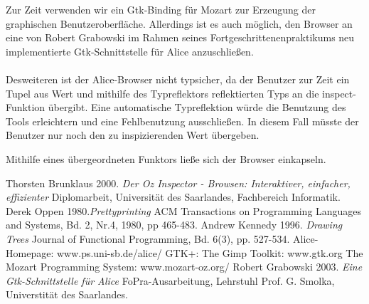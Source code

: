\documentclass[12pt,a4paper]{article}
\begin{document}
Zur Zeit verwenden wir ein Gtk-Binding f\"ur Mozart \cite{mo:mo}
zur Erzeugung der graphischen Benutzeroberfl\"ache. Allerdings ist 
es auch m\"oglich, den Browser an eine von Robert Grabowski im Rahmen 
seines Fortgeschrittenenpraktikums neu implementierte Gtk-Schnittstelle
f\"ur Alice \cite{gr:gt} anzuschlie\ss en.

\paragraph{}

Desweiteren ist der Alice-Browser nicht typsicher, 
da der Benutzer zur Zeit ein Tupel aus 
Wert und mithilfe des Typreflektors reflektierten Typs 
an die inspect-Funktion \"ubergibt.  
Eine automatische Typreflektion w\"urde die Benutzung des Tools 
erleichtern und eine Fehlbenutzung ausschlie\ss en. 
In diesem Fall m\"usste der Benutzer nur noch den zu 
inspizierenden Wert \"ubergeben. 

Mithilfe eines \"ubergeordneten Funktors lie\ss e 
sich der Browser einkapseln.


\begin{thebibliography}{99}

 Thorsten Brunklaus 2000. {\em Der Oz Inspector - Browsen: 
    Interaktiver, einfacher, effizienter} Diplomarbeit, Universit\"{a}t 
    des Saarlandes, Fachbereich Informatik.
 Derek Oppen 1980.{\em Prettyprinting} ACM Transactions 
  on Programming Languages and Systems, Bd. 2, Nr.4, 1980, pp 465-483.
 Andrew Kennedy 1996. {\em Drawing Trees} 
                Journal of Functional Programming, Bd. 6(3), pp. 527-534.
 Alice-Homepage: www.ps.uni-sb.de/alice/
 GTK+: The Gimp Toolkit: www.gtk.org 
 The Mozart Programming System: www.mozart-oz.org/
 Robert Grabowski 2003. {\em Eine Gtk-Schnittstelle f\"ur 
                Alice} 
                FoPra-Ausarbeitung, Lehrstuhl Prof. G. Smolka, 
                Universtit\"at des Saarlandes.

\end{thebibliography}
\end{document}
